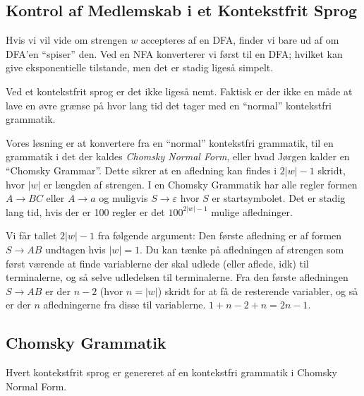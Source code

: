 \subsection{Kontrol af Medlemskab i et Kontekstfrit Sprog}%
\label{subsec:label}

Hvis vi vil vide om strengen $w$ accepteres af en DFA, finder vi bare ud af om DFA'en ``spiser'' den. Ved en NFA konverterer vi først til en DFA; hvilket kan give eksponentielle tilstande, men det er stadig ligeså simpelt.

Ved et kontekstfrit sprog er det ikke ligeså nemt. Faktisk er der ikke en måde at lave en øvre grænse på hvor lang tid det tager med en ``normal'' kontekstfri grammatik.

Vores løsning er at konvertere fra en ``normal'' kontekstfri grammatik, til en grammatik i det der kaldes \textit{Chomsky Normal Form}, eller hvad Jørgen kalder en ``Chomsky Grammar''. Dette sikrer at en afledning kan findes i $2|w|-1$ skridt, hvor $|w|$ er længden af strengen. I en Chomsky Grammatik har alle regler formen $A \rightarrow BC$ eller $A \rightarrow a$ og muligvis $S \rightarrow \varepsilon$ hvor $S$ er startsymbolet. Det er stadig lang tid, hvis der er 100 regler er det $100^{2|w|-1}$ mulige afledninger.

Vi får tallet $2|w|-1$ fra følgende argument: Den første afledning er af formen $S \rightarrow AB$ undtagen hvis $|w| = 1$. Du kan tænke på afledningen af strengen som først værende at finde variablerne der skal udlede (eller aflede, idk) til terminalerne, og så selve udledelsen til terminalerne. Fra den første afledningen $S \rightarrow AB$ er der $n-2$ (hvor $n = |w|$) skridt for at få de resterende variabler, og så er der $n$ afledningerne fra disse til variablerne. $ 1 + n-2 + n = 2n-1$.

\subsection{Chomsky Grammatik}%
\label{subsec:label}

\begin{theorem}
	Hvert kontekstfrit sprog er genereret af en kontekstfri grammatik i Chomsky Normal Form.
\end{theorem}

